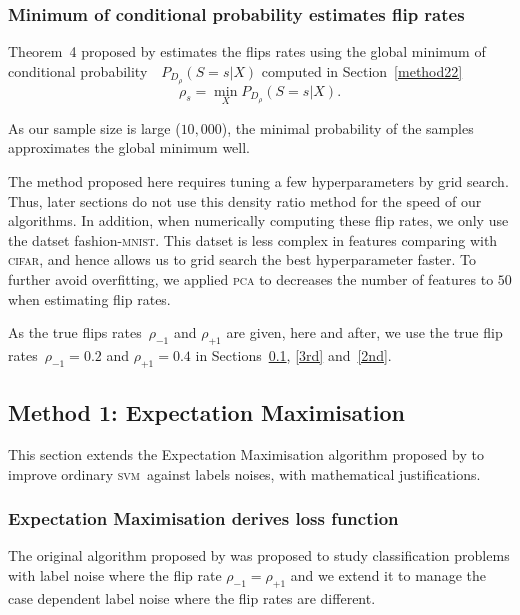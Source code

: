 \documentclass[12pt]{article} %
\newcommand{\svm}{\textsc{svm}}
\newcommand{\rhoo}{\rho_{+1}}
\newcommand{\rhoz}{\rho_{-1}}
\newcommand{\mnist}{fashion-\textsc{mnist}}
\begin{document}
\subsubsection{Minimum of conditional probability estimates flip rates}\label{method23}
Theorem~4 proposed by \citet{liu2016classification} estimates the flips rates using the global minimum of conditional probability~~$P_{D_\rho}(S=s|X)$ computed in Section~\ref{method22}
\begin{equation*}\label{eq:fliprate}
\rho_s=\min _X P_{D_\rho}(S=s|X).
\end{equation*}

As our sample size is large ($10,000$), the minimal probability of the samples approximates the global minimum well.

The method proposed here requires tuning a few hyperparameters by grid search. Thus, later sections do not use this density ratio method for the speed of our algorithms.
In addition, when numerically computing these flip rates, we only use the datset \mnist. This datset is less complex in features comparing with \textsc{cifar}, and hence allows us to grid search the best hyperparameter faster. To further avoid overfitting, we applied \textsc{pca} to decreases the number of features to $50$ when estimating flip rates.

As the true flips rates~$\rhoz$ and $\rhoo$ are given, here and after, we use the true flip rates~$\rhoz=0.2$ and $\rhoo=0.4$ in Sections~\ref{1st}, \ref{3rd} and~\ref{2nd}.


\subsection{Method 1: Expectation Maximisation}\label{1st}
This section extends the Expectation Maximisation algorithm proposed by \citet{pmlr-v20-biggio11} to improve ordinary \svm\ against labels noises, with mathematical justifications.
\subsubsection{Expectation Maximisation derives loss function}
The original algorithm proposed by \citet{pmlr-v20-biggio11} was proposed to study classification problems with label noise where the flip rate $\rhoz=\rhoo$ and we extend it to manage the case dependent label noise where the flip rates are different.
\end{document}
